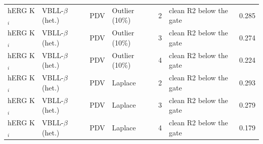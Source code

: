 {\begin{longtable}{llllcll}
hERG K$_i$ & VBLL-$\beta$ (het.) & PDV & Outlier (10\%) & 2 & clean R2 below the gate & 0.285 \\
hERG K$_i$ & VBLL-$\beta$ (het.) & PDV & Outlier (10\%) & 3 & clean R2 below the gate & 0.274 \\
hERG K$_i$ & VBLL-$\beta$ (het.) & PDV & Outlier (10\%) & 4 & clean R2 below the gate & 0.224 \\
hERG K$_i$ & VBLL-$\beta$ (het.) & PDV & Laplace & 2 & clean R2 below the gate & 0.293 \\
hERG K$_i$ & VBLL-$\beta$ (het.) & PDV & Laplace & 3 & clean R2 below the gate & 0.279 \\
hERG K$_i$ & VBLL-$\beta$ (het.) & PDV & Laplace & 4 & clean R2 below the gate & 0.179 \\
\bottomrule
\end{longtable}}

